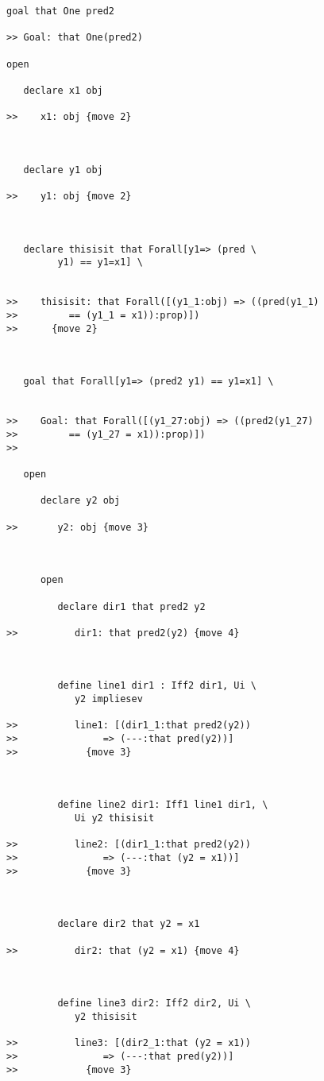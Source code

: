 \documentclass[12pt]{article}
\begin{document}
\begin{verbatim}
goal that One pred2

>> Goal: that One(pred2)

open

   declare x1 obj

>>    x1: obj {move 2}



   declare y1 obj

>>    y1: obj {move 2}



   declare thisisit that Forall[y1=> (pred \
         y1) == y1=x1] \


>>    thisisit: that Forall([(y1_1:obj) => ((pred(y1_1)
>>         == (y1_1 = x1)):prop)])
>>      {move 2}



   goal that Forall[y1=> (pred2 y1) == y1=x1] \


>>    Goal: that Forall([(y1_27:obj) => ((pred2(y1_27)
>>         == (y1_27 = x1)):prop)])
>>      

   open

      declare y2 obj

>>       y2: obj {move 3}



      open

         declare dir1 that pred2 y2

>>          dir1: that pred2(y2) {move 4}



         define line1 dir1 : Iff2 dir1, Ui \
            y2 impliesev

>>          line1: [(dir1_1:that pred2(y2))
>>               => (---:that pred(y2))]
>>            {move 3}



         define line2 dir1: Iff1 line1 dir1, \
            Ui y2 thisisit

>>          line2: [(dir1_1:that pred2(y2))
>>               => (---:that (y2 = x1))]
>>            {move 3}



         declare dir2 that y2 = x1

>>          dir2: that (y2 = x1) {move 4}



         define line3 dir2: Iff2 dir2, Ui \
            y2 thisisit

>>          line3: [(dir2_1:that (y2 = x1))
>>               => (---:that pred(y2))]
>>            {move 3}




\end{verbatim}
\end{document}
